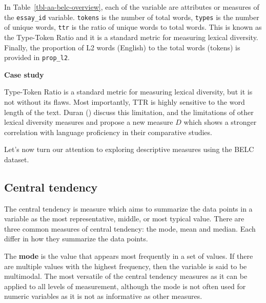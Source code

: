 \documentclass[
  letterpaper,
]{latex/krantz}
\theoremstyle{definition}
\theoremstyle{remark}
\begin{document}
In Table~\ref{tbl-aa-belc-overview}, each of the variable are attributes
or measures of the \texttt{essay\_id} variable. \texttt{tokens} is the
number of total words, \texttt{types} is the number of unique words,
\texttt{ttr} is the ratio of unique words to total words. This is known
as the Type-Token Ratio and it is a standard metric for measuring
lexical diversity. Finally, the proportion of L2 words (English) to the
total words (tokens) is provided in \texttt{prop\_l2}.

\begin{tcolorbox}[enhanced jigsaw, colframe=quarto-callout-color-frame, breakable, bottomrule=.15mm, arc=.35mm, left=2mm, opacityback=0, rightrule=.15mm, colback=white, toprule=.15mm, leftrule=.75mm]

\textbf{ Case study}

Type-Token Ratio is a standard metric for measuring lexical diversity,
but it is not without its flaws. Most importantly, TTR is highly
sensitive to the word length of the text. Duran
() discuss this limitation, and the
limitations of other lexical diversity measures and propose a new
measure \(D\) which shows a stronger correlation with language
proficiency in their comparative studies.

\end{tcolorbox}

Let's now turn our attention to exploring descriptive measures using the
BELC dataset.

\subsection{Central tendency}\label{sec-aa-central-tendency}

The central tendency is measure which aims to summarize the data points
in a variable as the most representative, middle, or most typical value.
There are three common measures of central tendency: the mode, mean and
median. Each differ in how they summarize the data points.

The \textbf{mode} is the value that appears most frequently in a set of
values. If there are multiple values with the highest frequency, then
the variable is said to be multimodal. The most versatile of the central
tendency measures as it can be applied to all levels of measurement,
although the mode is not often used for numeric variables as it is not
as informative as other measures.
\end{document}
